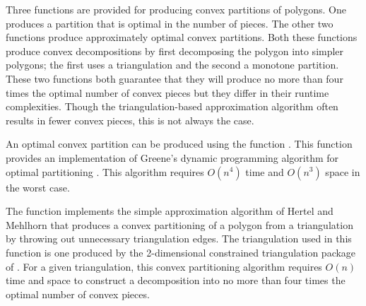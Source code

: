 %
Three functions are provided for producing convex partitions of polygons.
One produces a partition that is optimal in the number of pieces. 
The other two functions produce approximately optimal convex partitions.
Both these functions produce convex decompositions by first decomposing the 
polygon into simpler polygons; the first uses a triangulation and the second a
monotone partition.  These two functions both guarantee that they will produce 
no more than four times the optimal number of convex pieces but they differ in 
their runtime complexities.  Though the triangulation-based approximation
algorithm often results in fewer convex pieces, this is not always the case.

An optimal convex partition can be produced using the function
.%
This function provides an
implementation of Greene's dynamic programming algorithm for optimal
partitioning \cite{g-dpcp-83}. 
This algorithm requires $O(n^4)$ time and $O(n^3)$ space in the worst case.  

The function
implements the simple approximation algorithm of Hertel and Mehlhorn 
\cite{hm-ftsp-83} that 
produces a convex partitioning of a polygon from a triangulation by 
throwing out unnecessary triangulation edges.
The triangulation used in this function is one produced by the
2-dimensional constrained triangulation
package of \cgal.  For a given triangulation, this convex partitioning 
algorithm requires $O(n)$ time and space to construct a decomposition into 
no more than four times the optimal number of convex pieces.

